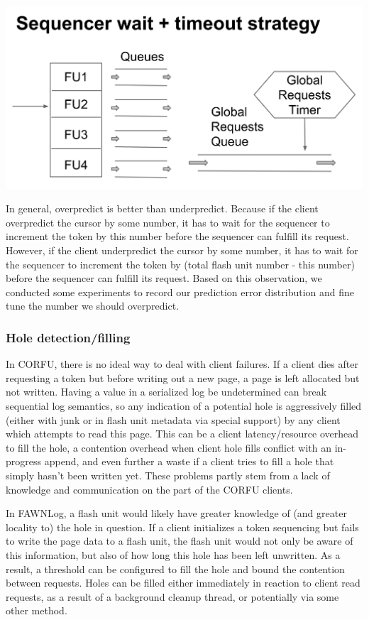 \documentclass[letterpaper,twocolumn,10pt]{article}
\begin{document}
\begin{center}
\includegraphics[width=.5\textwidth]{3.png}
\end{center}

In general, overpredict is better than underpredict. Because if the client overpredict the cursor by some number, it has to wait for the sequencer to increment the token by this number before the sequencer can fulfill its request. However, if the client underpredict the cursor by some number, it has to wait for the sequencer to increment the token by (total flash unit number - this number) before the sequencer can fulfill its request. Based on this observation, we conducted some experiments to record our prediction error distribution and fine tune the number we should overpredict.

\subsubsection{Hole detection/filling}
In CORFU, there is no ideal way to deal with client failures. If a client dies after requesting a token but before writing out a new page, a page is left allocated but not written. Having a value in a serialized log be undetermined can break sequential log semantics, so any indication of a potential hole is aggressively filled (either with junk or in flash unit metadata via special support) by any client which attempts to read this page. This can be a client latency/resource overhead to fill the hole, a contention overhead when client hole fills conflict with an in-progress append, and even further a waste if a client tries to fill a hole that simply hasn’t been written yet. These problems partly stem from a lack of knowledge and communication on the part of the CORFU clients.

In FAWNLog, a flash unit would likely have greater knowledge of (and greater locality to) the hole in question. If a client initializes a token sequencing but fails to write the page data to a flash unit, the flash unit would not only be aware of this information, but also of how long this hole has been left unwritten. As a result, a threshold can be configured to fill the hole and bound the contention between requests. Holes can be filled either immediately in reaction to client read requests, as a result of a background cleanup thread, or potentially via some other method.
\end{document}
